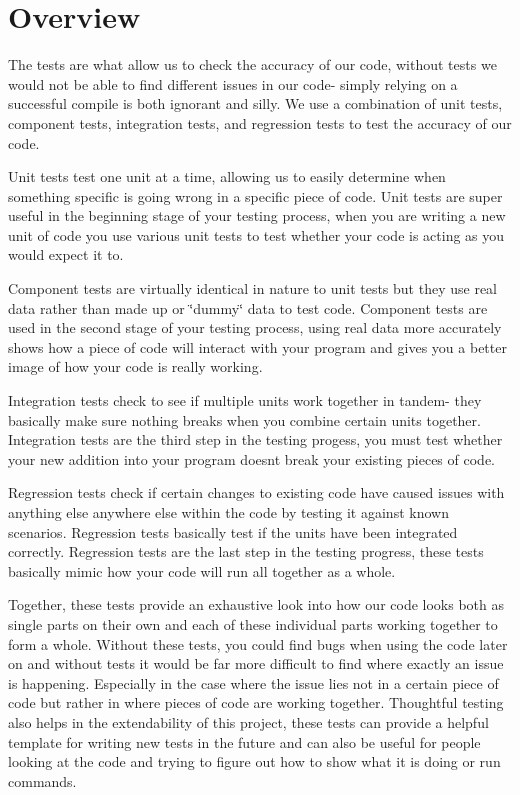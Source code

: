 \hypertarget{tests_description_Testing}{}\section{Overview}\label{tests_description_Testing}
The tests are what allow us to check the accuracy of our code, without tests we would not be able to find different issues in our code-\/ simply relying on a successful compile is both ignorant and silly. We use a combination of unit tests, component tests, integration tests, and regression tests to test the accuracy of our code.

Unit tests test one unit at a time, allowing us to easily determine when something specific is going wrong in a specific piece of code. Unit tests are super useful in the beginning stage of your testing process, when you are writing a new \textquotesingle{}unit\textquotesingle{} of code you use various unit tests to test whether your code is acting as you would expect it to.

Component tests are virtually identical in nature to unit tests but they use real data rather than made up or \char`\"{}dummy\char`\"{} data to test code. Component tests are used in the second stage of your testing process, using real data more accurately shows how a piece of code will interact with your program and gives you a better image of how your code is really working.

Integration tests check to see if multiple units work together in tandem-\/ they basically make sure nothing breaks when you combine certain units together. Integration tests are the third step in the testing progess, you must test whether your new addition into your program doesn\textquotesingle{}t break your existing pieces of code.

Regression tests check if certain changes to existing code have caused issues with anything else anywhere else within the code by testing it against known scenarios. Regression tests basically test if the units have been integrated correctly. Regression tests are the last step in the testing progress, these tests basically mimic how your code will run all together as a whole.

Together, these tests provide an exhaustive look into how our code looks both as single parts on their own and each of these individual parts working together to form a whole. Without these tests, you could find bugs when using the code later on and without tests it would be far more difficult to find where exactly an issue is happening. Especially in the case where the issue lies not in a certain piece of code but rather in where pieces of code are working together. Thoughtful testing also helps in the extendability of this project, these tests can provide a helpful template for writing new tests in the future and can also be useful for people looking at the code and trying to figure out how to show what it is doing or run commands.

